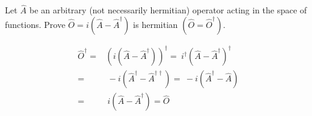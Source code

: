 \documentclass[11pt,letterpaper]{article}%
\begin{document}
\begin{enumerate}[label=\Large{\textbf{\arabic*.}}]
{{\begin{enumerate}[label=\textit{\roman*.}]
\end{enumerate}
}

\item{
Let $\hat{A}$ be an arbitrary (not necessarily hermitian) operator acting in the space of functions. Prove $\hat{O} = i\left(\hat{A} - \hat{A}^\dag\right)$ is hermitian $(\hat{O}=\hat{O}^\dag)$.

\begin{equation}
\label{Odag}
\begin{split}
\hat{O}^\dag =& \left( i\left(\hat{A} - \hat{A}^\dag\right) \right)^\dag =\ i^\dag\left(\hat{A} - \hat{A}^\dag\right)^\dag\\
=&\ -i\left(\hat{A}^\dag - \hat{A}^{\dag\dag}\right) =\ -i\left(\hat{A}^\dag - \hat{A}\right)\\
=&\ i\left(\hat{A} - \hat{A}^\dag\right) = \hat{O}
\end{split}
\end{equation}

}

}


\end{enumerate}
\end{document}
